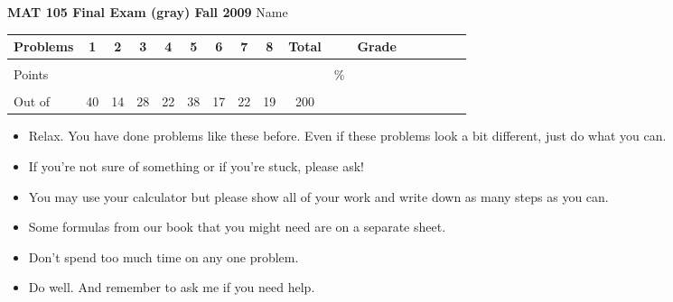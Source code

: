 \documentclass[12pt]{article}
\begin{document}
{\bf MAT 105 Final Exam (gray) Fall 2009} \hspace{.4in} {\large Name} \hrulefill

\hspace{.2in}

\begin{center}

\begin{tabular}
{|l|c|c|c|c|c|c|c|c|c|c|c|c|c|c|c|c|} \hline

 Problems & \hspace{5 pt} 1 \hspace{5 pt}  & \hspace{5 pt} 2 \hspace{5 pt} & \hspace{5 pt} 3 \hspace{5 pt} & \hspace{5 pt} 4 \hspace{5 pt}& \hspace{5 pt} 5 \hspace{5 pt} & \hspace{5 pt} 6 \hspace{5 pt} & \hspace{5 pt} 7 \hspace{5 pt}   & \hspace{5 pt} 8 \hspace{5 pt} &  \hspace{5 pt} Total  \hspace{5 pt} & &  \hspace{5 pt} Grade \hspace{5 pt}  \\ \hline
&&&&&&&&&&&\\  
Points &&&&&&&&&&   \hspace{.6in}\% &  \\ 
&&&&&&&&&&& \\  \hline
Out of & 40  & 14 & 28 & 22 & 38 & 17 & 22 & 19 &200 & & \\ \hline

\end {tabular}
 
\end{center}

\hspace{.2in}

\begin{itemize}
\item Relax.  You have done problems like these before. Even if these problems look a bit different, just do what you can. 
\item  If you're not sure of something or if you're stuck, please ask! 
\item You may use your calculator but please show all of your work and write down as many steps as you can.  
\item Some formulas from our book that you might need are on a separate sheet.
\item Don't spend too much time on any one problem.
\item  Do well.  And remember to ask me if you need help.
\end{itemize}
\end{document}
